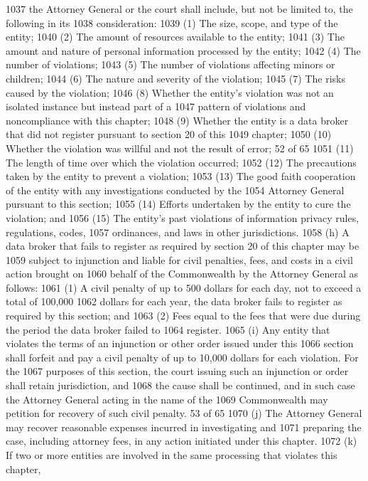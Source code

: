 1037 the Attorney General or the court shall include, but not be limited to, the following in its
1038 consideration:
1039 (1) The size, scope, and type of the entity;
1040 (2) The amount of resources available to the entity;
1041 (3) The amount and nature of personal information processed by the entity;
1042 (4) The number of violations;
1043 (5) The number of violations affecting minors or children;
1044 (6) The nature and severity of the violation;
1045 (7) The risks caused by the violation;
1046 (8) Whether the entity’s violation was not an isolated instance but instead part of a
1047 pattern of violations and noncompliance with this chapter;
1048 (9) Whether the entity is a data broker that did not register pursuant to section 20 of this
1049 chapter;
1050 (10) Whether the violation was willful and not the result of error;
52 of 65
1051 (11) The length of time over which the violation occurred;
1052 (12) The precautions taken by the entity to prevent a violation;
1053 (13) The good faith cooperation of the entity with any investigations conducted by the
1054 Attorney General pursuant to this section;
1055 (14) Efforts undertaken by the entity to cure the violation; and
1056 (15) The entity’s past violations of information privacy rules, regulations, codes,
1057 ordinances, and laws in other jurisdictions.
1058 (h) A data broker that fails to register as required by section 20 of this chapter may be
1059 subject to injunction and liable for civil penalties, fees, and costs in a civil action brought on
1060 behalf of the Commonwealth by the Attorney General as follows:
1061 (1) A civil penalty of up to 500 dollars for each day, not to exceed a total of 100,000
1062 dollars for each year, the data broker fails to register as required by this section; and
1063 (2) Fees equal to the fees that were due during the period the data broker failed to
1064 register.
1065 (i) Any entity that violates the terms of an injunction or other order issued under this
1066 section shall forfeit and pay a civil penalty of up to 10,000 dollars for each violation. For the
1067 purposes of this section, the court issuing such an injunction or order shall retain jurisdiction, and
1068 the cause shall be continued, and in such case the Attorney General acting in the name of the
1069 Commonwealth may petition for recovery of such civil penalty.
53 of 65
1070 (j) The Attorney General may recover reasonable expenses incurred in investigating and
1071 preparing the case, including attorney fees, in any action initiated under this chapter.
1072 (k) If two or more entities are involved in the same processing that violates this chapter,
